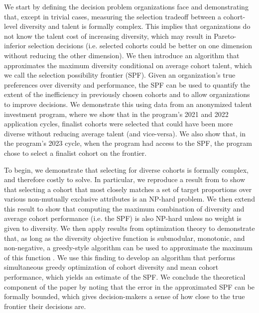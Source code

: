 We start by defining the decision problem organizations face and demonstrating that, except in trivial cases, measuring the selection tradeoff between a cohort-level diversity and talent is formally complex. This implies that organizations do not know the talent cost of increasing diversity, which may result in Pareto-inferior selection decisions (i.e. selected cohorts could be better on one dimension without reducing the other dimension). We then introduce an algorithm that approximates the maximum diversity conditional on average cohort talent, which we call the selection possibility frontier (SPF). Given an organization's true preferences over diversity and performance, the SPF can be used to quantify the extent of the inefficiency in previously chosen cohorts and to allow organizations to improve decisions. We demonstrate this using data from an anonymized talent investment program, where we show that in the program's 2021 and 2022 application cycles, finalist cohorts were selected that could have been more diverse without reducing average talent (and vice-versa). We also show that, in the program's 2023 cycle, when the program had access to the SPF, the program chose to select a finalist cohort on the frontier. 

To begin, we demonstrate that selecting for diverse cohorts is formally complex, and therefore costly to solve. In particular, we reproduce a result from \textcite{huppenkothen2020entrofy} to show that selecting a cohort that most closely matches a set of target proportions over various non-mutually exclusive attributes is an NP-hard problem. We then extend this result to show that computing the maximum combination of diversity and average cohort performance (i.e. the SPF) is also NP-hard unless no weight is given to diversity. We then apply results from optimization theory to demonstrate that, as long as the diversity objective function is submodular, monotonic, and non-negative, a greedy-style algorithm can be used to approximate the maximum of this function \cite{huppenkothen2020entrofy}. We use this finding to develop an algorithm that performs simultaneous greedy optimization of cohort diversity and mean cohort performance, which yields an estimate of the SPF. We conclude the theoretical component of the paper by noting that the error in the approximated SPF can be formally bounded, which gives decision-makers a sense of how close to the true frontier their decisions are. 

